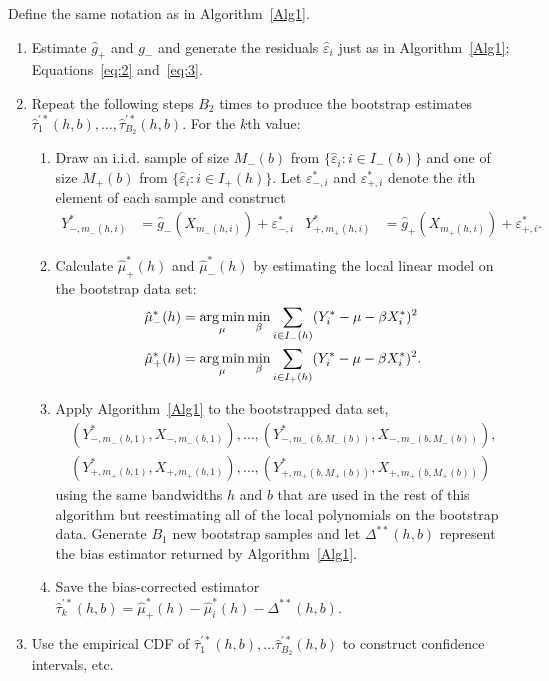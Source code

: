 \documentclass[12pt,fleqn]{article}
\begin{document}
\begin{algorithm}\label{Alg2}
  Define the same notation as in Algorithm~\ref{Alg1}.
  \begin{enumerate}
  \item Estimate $\hat g_+$ and $g_-$ and generate the residuals
    $\hat\varepsilon_i$ just as in Algorithm~\ref{Alg1}; Equations~\eqref{eq:2}
    and~\eqref{eq:3}.
  \item Repeat the following steps $B_{2}$ times to produce the
    bootstrap estimates
    $\hat\tau_1^{\prime*}(h,b), \dots, \hat\tau_{B_{2}}^{\prime*}(h,b)$. For the
    $k$th value:
    \begin{enumerate}
    \item Draw an i.i.d. sample of size $M_-(b)$ from
      $\{\hat\varepsilon_i : i \in I_-(b)\}$ and one of size $M_+(b)$ from
      $\{\hat\varepsilon_i : i \in I_+(h)\}$. Let $\varepsilon_{-,i}^{*}$ and
      $\varepsilon_{+,i}^{*}$ denote the $i$th element of each sample and
      construct
      \begin{align*}
        Y_{-,m_-(h,i)}^* &= \hat g_-(X_{m_-(h,i)}) + \varepsilon_{-,i}^{*} &
        Y_{+,m_+(h,i)}^* &= \hat g_+(X_{m_{+}(h,i)}) + \varepsilon_{+,i}^{*}.
      \end{align*}
    \item Calculate $\hat\mu_+^*(h)$ and $\hat\mu_-^*(h)$ by estimating the
      local linear model on the bootstrap data set:
      \begin{align*}
        \hat\mu_-^*(h)
        &= \argmin_{\mu} \min_{\beta} \ssum[-]{i}{h}
          (Y_i^* - \mu - \beta X_i^*)^2 \\
        \hat\mu_+^*(h)
        &= \argmin_{\mu} \min_{\beta} \ssum[+]{i}{h}
          (Y_i^* - \mu - \beta X_i^*)^2.
      \end{align*}
    \item Apply Algorithm~\ref{Alg1} to the bootstrapped data set,
      \begin{multline*}
        (Y_{-,m_-(b,1)}^{*}, X_{-,m_-(b,1)}),\dots,
        (Y_{-,m_-(b,M_-(b))}^{*},X_{-,m_-(b,M_-(b))}), \\
        (Y_{+,m_+(b,1)}^{*}, X_{+,m_+(b,1)}),\dots,
        (Y_{+,m_+(b,M_+(b))}^{*},X_{+,m_+(b,M_+(b))})
      \end{multline*}
      using the same bandwidths $h$ and $b$ that are used in the rest of this
      algorithm but reestimating all of the local polynomials on the bootstrap
      data. Generate $B_1$ new bootstrap samples and let $\Delta^{**}(h,b)$
      represent the bias estimator returned by Algorithm~\ref{Alg1}.
    \item Save the bias-corrected estimator
      $\hat\tau_k^{\prime*}(h,b) = \hat\mu_+^*(h) - \hat\mu_i^*(h)
      - \Delta^{**}(h,b)$.
    \end{enumerate}
  \item Use the empirical CDF of
    $\hat\tau_1^{\prime*}(h,b),\dots \hat\tau_{B_2}^{\prime*}(h,b)$ to
    construct confidence intervals, etc.
  \end{enumerate}
\end{algorithm}
\end{document}
